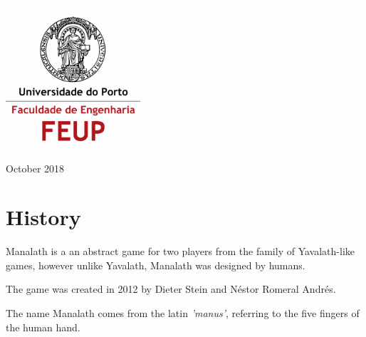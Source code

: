 \documentclass[12pt]{article}
\begin{document}
\begin{titlepage}
\includegraphics[width=50mm,scale=0.5]{feuplogo.png}\\[0.5cm] %





{\large October 2018}\\[2cm] %


\vfill %

\end{titlepage}
\tableofcontents
\pagebreak

\section{History}
  \hspace{0.6cm}
  Manalath is a an abstract game for two players from the family of Yavalath-like
  games, however unlike Yavalath, Manalath was designed by humans.

  The game was created in 2012 by  Dieter Stein and Néstor Romeral Andrés.

  The name Manalath comes from the latin \textit{'manus'}, referring to the five
  fingers of the human hand.
\end{document}
